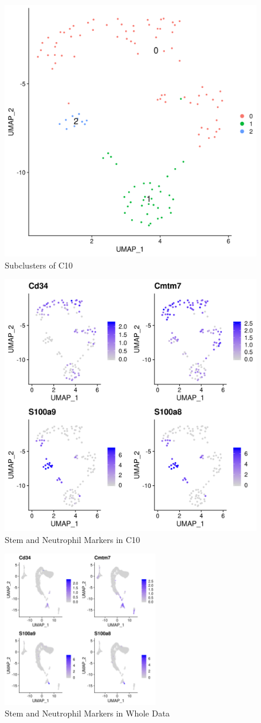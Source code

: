 \documentclass[lang=en]{elegantpaper}
\begin{document}
\begin{figure}[htbp]
    \centering
    \includegraphics[width=0.6\linewidth]{image/d10.png}
    \caption{Subclusters of C10 \label{d10}}
\end{figure}
\begin{figure}[htbp]
    \centering
    \includegraphics[width=0.6\linewidth]{image/f10.png}
    \caption{Stem and Neutrophil Markers in C10 \label{f10}}
\end{figure}
\begin{figure}[htbp]
    \centering
    \includegraphics[width=0.6\textwidth]{image/f10t.png}
    \caption{Stem and Neutrophil Markers in Whole Data \label{f10t}}
\end{figure}
\end{document}
